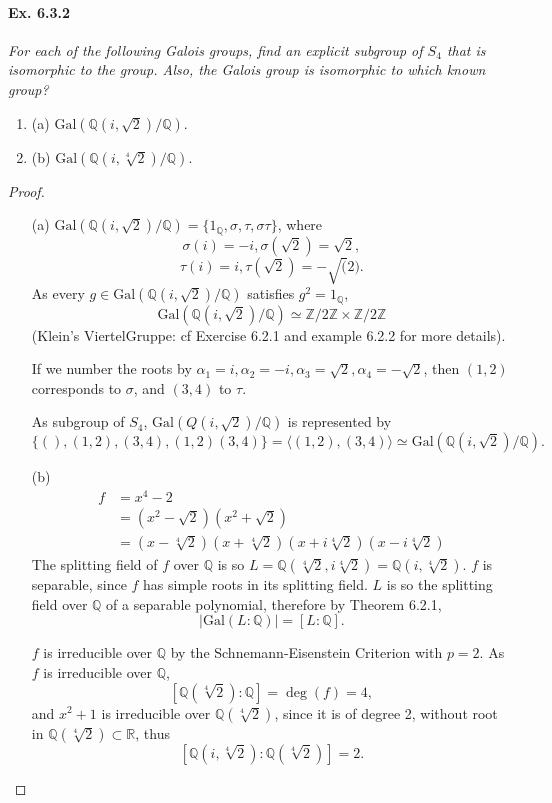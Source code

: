 \documentclass[11pt,a4paper]{article}
\newcommand{\be} {\begin{enumerate}}
\newcommand{\ee} {\end{enumerate}}
\newcommand{\Q}{\mathbb{Q}}
\newcommand{\Z}{\mathbb{Z}}
\newcommand{\R}{\mathbb{R}}
\newcommand{\Gal}{\mathrm{Gal}}
\begin{document}
\paragraph{Ex. 6.3.2}

{\it For each of the following Galois groups, find an explicit subgroup of $S_4$ that is isomorphic to the group. Also, the Galois group is isomorphic to which known group? 
\be
\item[(a)] $\Gal(\Q(i,\sqrt{2})/\Q)$.
\item[(b)] $\Gal(\Q(i,\sqrt[4]{2})/\Q)$.
\ee
}

\begin{proof}
\begin{enumerate}
\item[(a)]
$\Gal(\Q(i,\sqrt{2})/\Q) = \{1_{\Q}, \sigma, \tau, \sigma\tau\}$, where
$$\sigma(i) = -i, \sigma(\sqrt{2}) = \sqrt{2},$$
$$\tau(i) = i, \tau(\sqrt{2}) = -\sqrt(2).$$
As every  $g \in \Gal(\Q(i,\sqrt{2})/\Q)$  satisfies $g^2 = 1_{\Q}$, 
$$\Gal(\Q(i,\sqrt{2})/\Q) \simeq \Z/2\Z \times \Z/2\Z$$
(Klein's ViertelGruppe: cf Exercise 6.2.1 and example 6.2.2 for more details).

If we number the roots by $\alpha_1 = i, \alpha_2 = -i, \alpha_3 = \sqrt{2}, \alpha_4 = -\sqrt{2}$, then $(1,2)$ corresponds to $\sigma$, and $(3,4)$ to $\tau$.

As subgroup of $S_4$, $\Gal(Q(i,\sqrt{2})/\Q)$ is represented by $$\{ (), (1,2), (3,4), (1,2)(3,4)\} = \langle (1,2),(3,4) \rangle \simeq \Gal(\Q(i,\sqrt{2})/\Q).$$

\item[(b)]
 \begin{align*}
 f&=x^4-2\\
 &=(x^2-\sqrt{2})(x^2+\sqrt{2})\\
 &=(x-\sqrt[4]{2})(x+\sqrt[4]{2})(x+i\sqrt[4]{2})(x-i\sqrt[4]{2})
\end{align*}
The splitting field of $f$ over $\Q$ is so $L = \Q(\sqrt[4]{2},i\sqrt[4]{2}) = \Q(i,\sqrt[4]{2})$. $f$ is separable, since $f$ has simple roots in its splitting field. $L$ is so the splitting field over $\Q$ of a separable  polynomial, therefore by Theorem 6.2.1,$$\vert \Gal(L:\Q) \vert= [L:\Q].$$

$f$ is irreducible over $\Q$ by the Schnemann-Eisenstein Criterion with $p=2$.
As $f$ is irreducible over $\Q$, $$[\Q(\sqrt[4]{2}) : \Q] = \deg(f) = 4,$$ and $x^2+1$ is irreducible over $\Q(\sqrt[4]{2})$, since it is of degree 2, without root in $\Q(\sqrt[4]{2}) \subset \R$, thus $${[\Q(i,\sqrt[4]{2}) : \Q(\sqrt[4]{2})] = 2}.$$


\end{enumerate}
\end{proof}
\end{document}
